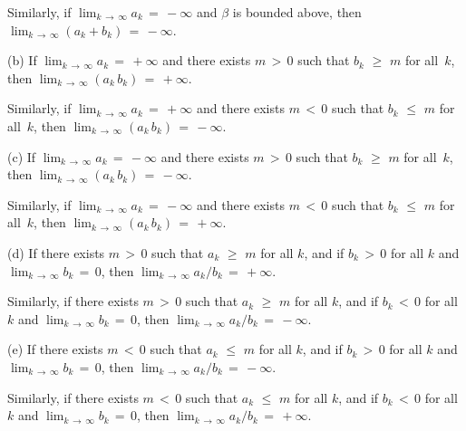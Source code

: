         Similarly, if $\lim_{k \,{\rightarrow}\, {\infty}} a_{k} \,=\, -{\infty}$ and ${\beta}$ is bounded above, then $\lim_{k \,{\rightarrow}\, {\infty}} (a_{k} + b_{k}) \,=\, -{\infty}$.

\V

        (b) If $\lim_{k \,{\rightarrow}\, {\infty}} a_{k} \,=\, +{\infty}$ and there exists $m\,>\,0$ such that $b_{k}\,\,{\geq}\,\,m$ for all~$k$,
    then $\lim_{k \,{\rightarrow}\, {\infty}} (a_{k}\,b_{k}) \,=\, +{\infty}$.

        Similarly, if $\lim_{k \,{\rightarrow}\, {\infty}} a_{k} \,=\, +{\infty}$
    and there exists $m\,<\,0$ such that $b_{k}\,\,{\leq}\,\,m$ for all~$k$, then $\lim_{k \,{\rightarrow}\, {\infty}} (a_{k}\,b_{k}) \,=\, -{\infty}$.

\V

        (c) If $\lim_{k \,{\rightarrow}\, {\infty}} a_{k} \,=\, -{\infty}$ and there exists $m\,>\,0$ such that $b_{k}\,\,{\geq}\,\,m$ for all~$k$,
    then $\lim_{k \,{\rightarrow}\, {\infty}} (a_{k}\,b_{k}) \,=\, -{\infty}$.

        Similarly, if $\lim_{k \,{\rightarrow}\, {\infty}} a_{k} \,=\, -{\infty}$
    and there exists $m\,<\,0$ such that $b_{k}\,\,{\leq}\,\,m$ for all~$k$, then $\lim_{k \,{\rightarrow}\, {\infty}} (a_{k}\,b_{k}) \,=\, +{\infty}$.

\V

        (d) If there exists $m\,>\,0$ such that $a_{k}\,\,{\geq}\,\,m$ for all $k$,
    and if $b_{k}\,>\,0$ for all $k$ and $\lim_{k \,{\rightarrow}\, {\infty}} b_{k} \,=\, 0$,
    then $\lim_{k \,{\rightarrow}\, {\infty}} a_{k}/b_{k} \,=\, +{\infty}$.

        Similarly, if there exists $m\,>\,0$ such that $a_{k}\,\,{\geq}\,\,m$ for all $k$,
    and if $b_{k}\,<\,0$ for all $k$ and $\lim_{k \,{\rightarrow}\, {\infty}} b_{k} \,=\, 0$,
    then $\lim_{k \,{\rightarrow}\, {\infty}} a_{k}/b_{k} \,=\, -{\infty}$.

\V

        (e) If there exists $m\,<\,0$ such that $a_{k}\,\,{\leq}\,\,m$ for all $k$,
    and if $b_{k}\,>\,0$ for all $k$ and $\lim_{k \,{\rightarrow}\, {\infty}} b_{k} \,=\, 0$,
    then $\lim_{k \,{\rightarrow}\, {\infty}} a_{k}/b_{k} \,=\, -{\infty}$.

        Similarly, if there exists $m\,<\,0$ such that $a_{k}\,\,{\leq}\,\,m$ for all $k$,
    and if $b_{k}\,<\,0$ for all $k$ and $\lim_{k \,{\rightarrow}\, {\infty}} b_{k} \,=\, 0$,
    then $\lim_{k \,{\rightarrow}\, {\infty}} a_{k}/b_{k} \,=\, +{\infty}$.

